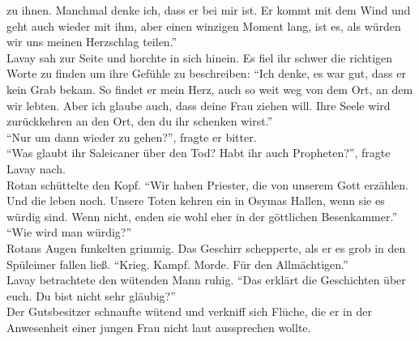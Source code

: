zu ihnen. Manchmal denke ich, dass er bei mir ist. Er kommt mit dem Wind und geht auch wieder 
mit ihm, aber einen winzigen Moment lang, ist es, als würden wir uns meinen Herzschlag teilen.''\\
Lavay sah zur Seite und horchte in sich hinein. Es fiel ihr schwer die richtigen Worte zu finden um 
ihre Gefühle zu beschreiben: ``Ich denke, es war gut, dass er kein Grab bekam. So findet er mein 
Herz, auch so weit weg von dem Ort, an dem wir lebten. Aber ich glaube auch, dass deine Frau ziehen 
will. Ihre Seele wird zurückkehren an den Ort, den du ihr schenken wirst.''\\
``Nur um dann wieder zu gehen?'', fragte er bitter.\\
``Was glaubt ihr Saleicaner über den Tod? Habt ihr auch Propheten?'', fragte Lavay nach.\\
Rotan schüttelte den Kopf. ``Wir haben Priester, die von unserem Gott erzählen. Und die leben noch. 
Unsere Toten kehren ein in Osymas Hallen, wenn sie es würdig sind. Wenn nicht, enden sie wohl eher 
in der göttlichen Besenkammer.''\\
``Wie wird man würdig?''\\
Rotans Augen funkelten grimmig. Das Geschirr schepperte, als er es grob in den Spüleimer fallen 
ließ. ``Krieg. Kampf. Morde. Für den Allmächtigen.''\\
Lavay betrachtete den wütenden Mann ruhig. ``Das erklärt die Geschichten über euch. Du bist nicht 
sehr gläubig?''\\
Der Gutsbesitzer schnaufte wütend und verkniff sich Flüche, die er in der Anwesenheit einer jungen 
Frau nicht laut aussprechen wollte.\\


